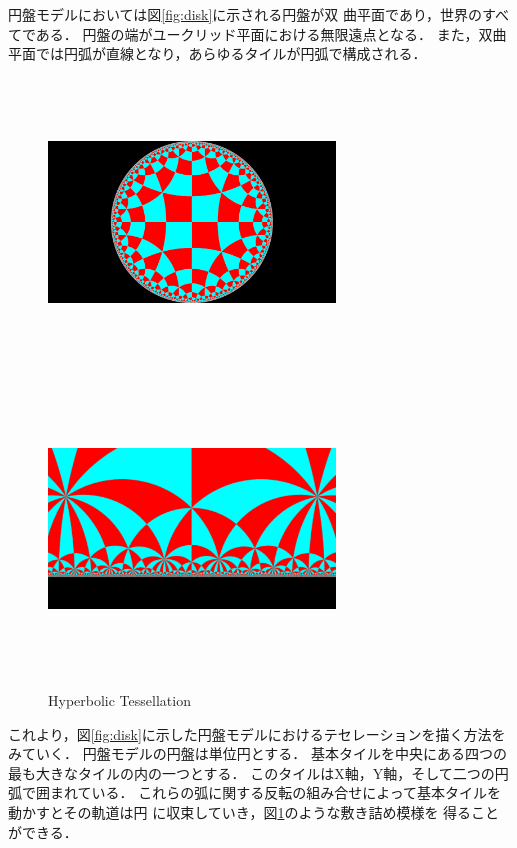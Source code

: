 円盤モデルにおいては図\ref{fig:disk}に示される円盤が双
曲平面であり，世界のすべてである．
円盤の端がユークリッド平面における無限遠点となる．
また，双曲平面では円弧が直線となり，あらゆるタイルが円弧で構成される．

\begin{figure}[h!tbp]
 \begin{minipage}{0.49\hsize}
  \center
  \includegraphics[width=3in, height=3in,
  keepaspectratio]{../img/tessellation/hyperbolicTessellation.pdf}
  \label{fig:disk}
 \end{minipage}
 \hspace*{\fill}
 \begin{minipage}{0.49\hsize}
  \center
  \includegraphics[width=3in, height=3in, keepaspectratio]{../img/tessellation/upperHalf.pdf}
  \label{fig:upperHalf}
 \end{minipage}
  \caption{Hyperbolic Tessellation}
  \label{fig:hyperbolicTessellation}
\end{figure}

これより，図\ref{fig:disk}に示した円盤モデルにおけるテセレーションを描く方法をみていく．
円盤モデルの円盤は単位円とする．
基本タイルを中央にある四つの最も大きなタイルの内の一つとする．
このタイルはX軸，Y軸，そして二つの円弧で囲まれている．
これらの弧に関する反転の組み合せによって基本タイルを動かすとその軌道は円
に収束していき，図\ref{fig:hyperbolicTessellation}のような敷き詰め模様を
得ることができる．

